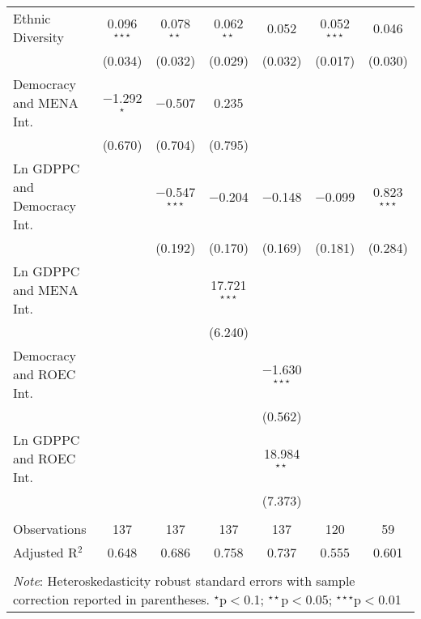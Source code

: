 \documentclass[../main.tex]{subfiles}
\begin{document}
\begin{table}[H]
\begin{tabular}{@{\extracolsep{5pt}}lcccccc}
  Ethnic Diversity & 0.096$^{\star\star\star}$ & 0.078$^{\star\star}$ & 0.062$^{\star\star}$ & 0.052 & 0.052$^{\star\star\star}$ & 0.046 \\ 
  & (0.034) & (0.032) & (0.029) & (0.032) & (0.017) & (0.030) \\ 
  Democracy and MENA Int. & $-$1.292$^{\star}$ & $-$0.507 & 0.235 &  &  &  \\ 
  & (0.670) & (0.704) & (0.795) &  &  &  \\ 
  Ln GDPPC and Democracy Int. &  & $-$0.547$^{\star\star\star}$ & $-$0.204 & $-$0.148 & $-$0.099 & 0.823$^{\star\star\star}$ \\ 
  &  & (0.192) & (0.170) & (0.169) & (0.181) & (0.284) \\ 
  Ln GDPPC and MENA Int. &  &  & 17.721$^{\star\star\star}$ &  &  &  \\ 
  &  &  & (6.240) &  &  &  \\ 
  Democracy and ROEC Int. &  &  &  & $-$1.630$^{\star\star\star}$ &  &  \\ 
  &  &  &  & (0.562) &  &  \\ 
  Ln GDPPC and ROEC Int. &  &  &  & 18.984$^{\star\star}$ &  &  \\ 
  &  &  &  & (7.373) &  &  \\ 
 \midrule \\[-1.8ex] 
Observations & 137 & 137 & 137 & 137 & 120 & 59 \\ 
Adjusted R$^{2}$ & 0.648 & 0.686 & 0.758 & 0.737 & 0.555 & 0.601 \\ 
\bottomrule \\[-1.8ex] 
\multicolumn{7}{l}{\textit{Note}: Heteroskedasticity robust standard errors with sample correction reported in parentheses. $^{\star}$p$<$0.1; $^{\star\star}$p$<$0.05; $^{\star\star\star}$p$<$0.01} \\ 
\end{tabular} 
\end{table} 
\end{document}
